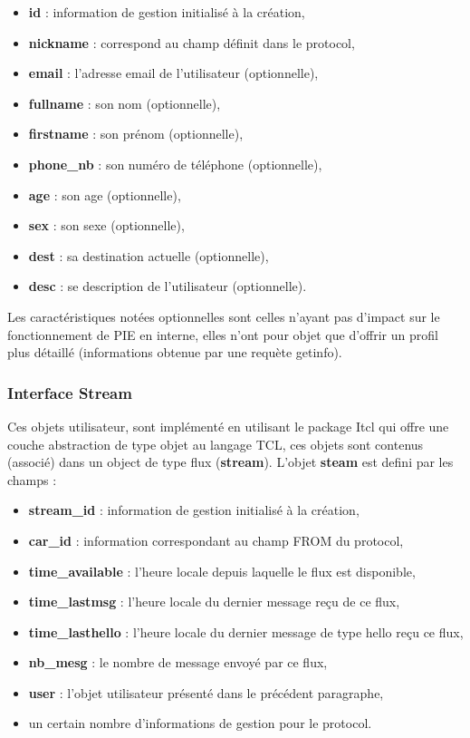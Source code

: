 \begin{itemize}
	\item \textbf{id} : information de gestion initialisé à la création,
	\item \textbf{nickname}	: correspond au champ définit dans le protocol,
	\item \textbf{email} : l'adresse email de l'utilisateur (optionnelle),
	\item \textbf{fullname} : son nom (optionnelle),
	\item \textbf{firstname} : son prénom (optionnelle),
	\item \textbf{phone\_nb} : son numéro de téléphone (optionnelle),
	\item \textbf{age} : son age (optionnelle),
	\item \textbf{sex} : son sexe (optionnelle),
	\item \textbf{dest} : sa destination actuelle (optionnelle),
	\item \textbf{desc} : se description de l'utilisateur (optionnelle).\\
\end{itemize}

Les caractéristiques notées optionnelles sont celles n'ayant pas d'impact
sur le fonctionnement de PIE en interne, elles n'ont pour objet que d'offrir
un profil plus détaillé (informations obtenue par une requète getinfo).
 
\subsubsection{Interface Stream}

Ces objets utilisateur, sont implémenté en utilisant le package Itcl qui offre
une couche abstraction de type objet au langage TCL, ces objets sont contenus
(associé) dans un object de type flux (\textbf{stream}). L'objet \textbf{steam}
est defini par les champs : \\

\begin{itemize}
	\item \textbf{stream\_id} : information de gestion initialisé à la création,
	\item \textbf{car\_id} : information correspondant au champ FROM du protocol,
	\item \textbf{time\_available} : l'heure locale depuis laquelle le flux est disponible,
	\item \textbf{time\_lastmsg} : l'heure locale du dernier message reçu de ce flux,
	\item \textbf{time\_lasthello} : l'heure locale du dernier message de type hello reçu ce flux,
	\item \textbf{nb\_mesg} : le nombre de message envoyé par ce flux,
	\item \textbf{user} : l'objet utilisateur présenté dans le précédent paragraphe,
	\item un certain nombre d'informations de gestion pour le protocol.
\end{itemize}


